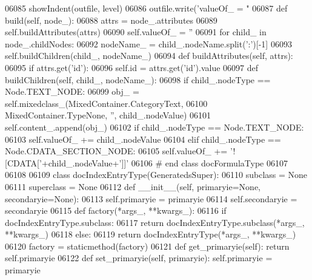 \begin{DoxyCode}
{{{{{{{{{{{{{{{{{{{{{{{{{{{{{{{{{{{{{{{{{{{{{{{{{{{{{{{{{{{{{{{{{{{{{{{{{{{{{{{{{{{{{{{{{{{{{{{{{{{{{{{{{{{{{{{{{{{{{{{{{{{{{{{{{{{{{{{{{{{{{{{{{{{{{{{{{{{{{{{{{{{{{{{{{{{{{{{{{{{{{{{{{{{{{{{{{{{{{{{{{{{{{{{{{{{{{{{{{{{{{{{{{{{{{{{{{{{{{{{{{{{{{{{{{{{{{{{{{{{{{{{{{{{{{{{{{{{{{{{{{{{{{{{{{{{{{{{{{{{{{{{{{{{{{{{{{{{{{{{{{{{{{{{{{{{{{{{{{{{{{{{{{{{{{{{{{{{{{{{{{{{{{{{{{{{{{{{{{{{{{06085         showIndent(outfile, level)
06086         outfile.write(\textcolor{stringliteral}{'valueOf\_ = "%
06087     \textcolor{keyword}{def }build(self, node\_):
06088         attrs = node\_.attributes
06089         self.buildAttributes(attrs)
06090         self.valueOf_ = \textcolor{stringliteral}{''}
06091         \textcolor{keywordflow}{for} child\_ \textcolor{keywordflow}{in} node\_.childNodes:
06092             nodeName\_ = child\_.nodeName.split(\textcolor{stringliteral}{':'})[-1]
06093             self.buildChildren(child\_, nodeName\_)
06094     \textcolor{keyword}{def }buildAttributes(self, attrs):
06095         \textcolor{keywordflow}{if} attrs.get(\textcolor{stringliteral}{'id'}):
06096             self.id = attrs.get(\textcolor{stringliteral}{'id'}).value
06097     \textcolor{keyword}{def }buildChildren(self, child\_, nodeName\_):
06098         \textcolor{keywordflow}{if} child\_.nodeType == Node.TEXT\_NODE:
06099             obj\_ = self.mixedclass_(MixedContainer.CategoryText,
06100                 MixedContainer.TypeNone, \textcolor{stringliteral}{''}, child\_.nodeValue)
06101             self.content\_.append(obj\_)
06102         \textcolor{keywordflow}{if} child\_.nodeType == Node.TEXT\_NODE:
06103             self.valueOf_ += child\_.nodeValue
06104         \textcolor{keywordflow}{elif} child\_.nodeType == Node.CDATA\_SECTION\_NODE:
06105             self.valueOf_ += \textcolor{stringliteral}{'![CDATA['}+child\_.nodeValue+\textcolor{stringliteral}{']]'}
06106 \textcolor{comment}{# end class docFormulaType}
06107 
06108 
06109 \textcolor{keyword}{class }docIndexEntryType(GeneratedsSuper):
06110     subclass = \textcolor{keywordtype}{None}
06111     superclass = \textcolor{keywordtype}{None}
06112     \textcolor{keyword}{def }__init__(self, primaryie=None, secondaryie=None):
06113         self.primaryie = primaryie
06114         self.secondaryie = secondaryie
06115     \textcolor{keyword}{def }factory(*args\_, **kwargs\_):
06116         \textcolor{keywordflow}{if} docIndexEntryType.subclass:
06117             \textcolor{keywordflow}{return} docIndexEntryType.subclass(*args\_, **kwargs\_)
06118         \textcolor{keywordflow}{else}:
06119             \textcolor{keywordflow}{return} docIndexEntryType(*args\_, **kwargs\_)
06120     factory = staticmethod(factory)
06121     \textcolor{keyword}{def }get_primaryie(self): \textcolor{keywordflow}{return} self.primaryie
06122     \textcolor{keyword}{def }set_primaryie(self, primaryie): self.primaryie = primaryie
}}}}}}}}}}}}}}}}}}}}}}}}}}}}}}}}}}}}}}}}}}}}}}}}}}}}}}}}}}}}}}}}}}}}}}}}}}}}}}}}}}}}}}}}}}}}}}}}}}}}}}}}}}}}}}}}}}}}}}}}}}}}}}}}}}}}}}}}}}}}}}}}}}}}}}}}}}}}}}}}}}}}}}}}}}}}}}}}}}}}}}}}}}}}}}}}}}}}}}}}}}}}}}}}}}}}}}}}}}}}}}}}}}}}}}}}}}}}}}}}}}}}}}}}}}}}}}}}}}}}}}}}}}}}}}}}}}}}}}}}}}}}}}}}}}}}}}}}}}}}}}}}}}}}}}}}}}}}}}}}}}}}}}}}}}}}}}}}}}}}}}}}}}}}}}}}}}}}}}}}}}}}}}}}}}}}}}}}}}}}}}
\end{DoxyCode}

